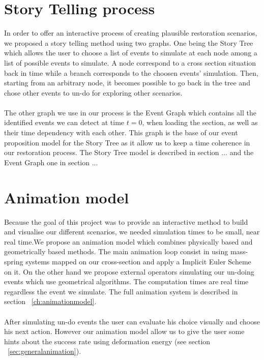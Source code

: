 \documentclass[12pt, a4paper]{report} %
\begin{document}
\section{Story Telling process}
\label{sub:storytel}
In order to offer an interactive process of creating plausible restoration scenarios, we proposed a story telling method using two graphs. One being the Story Tree which allows the user to choose a list of events to simulate at each node among a list of possible events to simulate. A node correspond to a cross section situation back in time while a branch corresponds to the choosen events' simulation. Then, starting from an arbitrary node, it becomes possible to go back in the tree and chose other events to un-do for exploring other scenarios.\\\\
The other graph we use in our process is the Event Graph which contains all the identified events we can detect at time $t = 0$, when loading the section, as well as their time dependency with each other. This graph is the base of our event proposition model for the Story Tree as it allow us to keep a time coherence in our restoration process. The Story Tree model is described in section ... and the Event Graph one in section ...
\section{Animation model}
Because the goal of this project was to provide an interactive method to build and visualise our different scenarios, we needed simulation times to be small, near real time.We propose an animation model which combines physically based and geometrically based methods. The main animation loop consist in using mass-spring systems mapped on our cross-section and apply a Implicit Euler Scheme on it. On the other hand we propose external operators simulating our un-doing events which use geometrical algorithms. The computation times are real time regardless the event we simulate. The full animation system is described in section ~\ref{ch:animationmodel}.\\\\
After simulating un-do events the user can evaluate his choice visually and choose his next action. However our animation model allow us to give the user some hints about the success rate using deformation energy (see section ~\ref{sec:generalanimation}).
\end{document}
